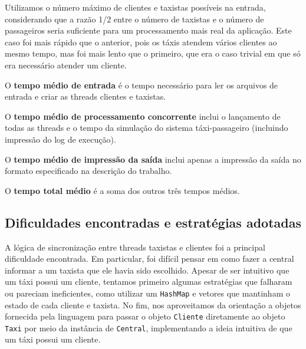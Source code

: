 \documentclass[a4paper,landscape,12pt]{article}
\begin{document}
Utilizamos o número máximo de clientes e taxistas possíveis na entrada, considerando que a razão 1/2 entre o número de taxistas e o número de passageiros seria suficiente para um processamento mais real da aplicação. Este caso foi mais rápido que o anterior, pois os táxis atendem vários clientes ao mesmo tempo, mas foi mais lento que o primeiro, que era o caso trivial em que só era necessário atender um cliente.

O \textbf{tempo médio de entrada} é o tempo necessário para ler os arquivos de entrada e criar as threads clientes e taxistas.

O \textbf{tempo médio de processamento concorrente} inclui o lançamento de todas as threads e o tempo da simulação do sistema táxi-passageiro (incluindo impressão do log de execução).

O \textbf{tempo médio de impressão da saída} inclui apenas a impressão da saída no formato especificado na descrição do trabalho.

O \textbf{tempo total médio} é a soma dos outros três tempos médios.

\subsection{Dificuldades encontradas e estratégias adotadas}
A lógica de sincronização entre threads taxistas e clientes foi a principal dificuldade encontrada. Em particular, foi difícil pensar em como fazer a central informar a um taxista que ele havia sido escolhido. Apesar de ser intuitivo que um táxi possui um cliente, tentamos primeiro algumas estratégias que falharam ou pareciam ineficientes, como utilizar um \texttt{HashMap} e vetores que mantinham o estado de cada cliente e taxista. No fim, nos aproveitamos da orientação a objetos fornecida pela linguagem para passar o objeto \texttt{Cliente} diretamente ao objeto \texttt{Taxi} por meio da instância de \texttt{Central}, implementando a ideia intuitiva de que um táxi possui um cliente.
\end{document}

